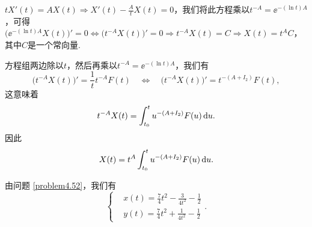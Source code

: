 \setcounter{solution}{51}
\begin{solution}
  \begin{inparaenum}[(a)]
    \item $tX'(t)=AX(t)\Rightarrow X'(t)-\frac AtX(t)=0$，我们将此方程乘以$t^{-A}=\ee^{-(\ln t)A}$，可得$\big(\ee^{-(\ln t)A}X(t) \big)'
        =0\Leftrightarrow \big(t^{-A}X(t)\big)'=0\Rightarrow t^{-A}X(t)=C\Rightarrow X(t)=t^AC$，其中$C$是一个常向量.

    \item 方程组两边除以$t$，然后再乘以$t^{-A}=\ee^{-(\ln t)A}$，我们有
        \[
          \big( t^{-A}X(t) \big)' = \frac1tt^{-A}F(t) \quad \Leftrightarrow \quad \big( t^{-A}X(t) \big)' = t^{-(A+I_2)}F(t),
        \]
        这意味着
        \[
          t^{-A}X(t) = \int_{t_0}^t u^{-(A+I_2)}F(u) \mathop{}\!\mathrm d u.
        \]
        因此
        \[
          X(t) = t^A\int_{t_0}^t u^{-(A+I_2)}F(u) \mathop{}\!\mathrm d u.
        \]
  \end{inparaenum}
\end{solution}

\begin{solution}
  由问题 \ref{problem4.52}，我们有
  \[
    \left\{
      \begin{aligned}
        & x(t) = \frac74t^2 - \frac3{4t^2} - \frac12 \\
        & y(t) = \frac74t^2 + \frac1{4t^2} - \frac12
      \end{aligned}
    \right..
  \]
\end{solution}

